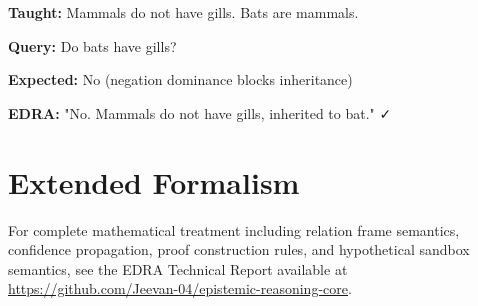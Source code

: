 \documentclass[11pt]{article}
\begin{document}
\textbf{Taught:} Mammals do not have gills. Bats are mammals.

\textbf{Query:} Do bats have gills?

\textbf{Expected:} No (negation dominance blocks inheritance)

\textbf{EDRA:} "No. Mammals do not have gills, inherited to bat." ✓

\section{Extended Formalism}

For complete mathematical treatment including relation frame semantics, confidence propagation, proof construction rules, and hypothetical sandbox semantics, see the EDRA Technical Report available at \url{https://github.com/Jeevan-04/epistemic-reasoning-core}.
\end{document}
